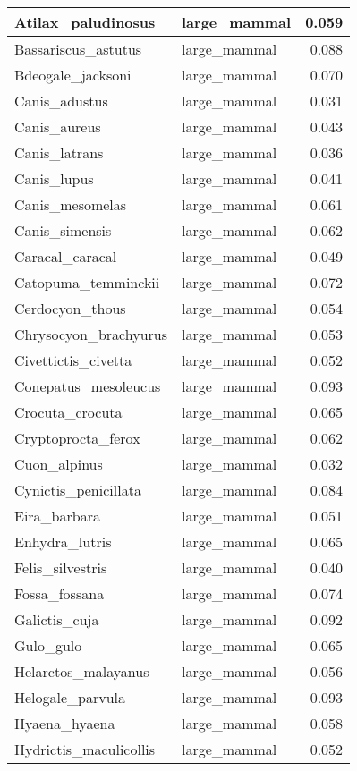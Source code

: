 \begin{table}
\begin{tabular}[t]{l|l|r}
\hline
Atilax\_paludinosus & large\_mammal & 0.059\\
\hline
Bassariscus\_astutus & large\_mammal & 0.088\\
\hline
Bdeogale\_jacksoni & large\_mammal & 0.070\\
\hline
Canis\_adustus & large\_mammal & 0.031\\
\hline
Canis\_aureus & large\_mammal & 0.043\\
\hline
Canis\_latrans & large\_mammal & 0.036\\
\hline
Canis\_lupus & large\_mammal & 0.041\\
\hline
Canis\_mesomelas & large\_mammal & 0.061\\
\hline
Canis\_simensis & large\_mammal & 0.062\\
\hline
Caracal\_caracal & large\_mammal & 0.049\\
\hline
Catopuma\_temminckii & large\_mammal & 0.072\\
\hline
Cerdocyon\_thous & large\_mammal & 0.054\\
\hline
Chrysocyon\_brachyurus & large\_mammal & 0.053\\
\hline
Civettictis\_civetta & large\_mammal & 0.052\\
\hline
Conepatus\_mesoleucus & large\_mammal & 0.093\\
\hline
Crocuta\_crocuta & large\_mammal & 0.065\\
\hline
Cryptoprocta\_ferox & large\_mammal & 0.062\\
\hline
Cuon\_alpinus & large\_mammal & 0.032\\
\hline
Cynictis\_penicillata & large\_mammal & 0.084\\
\hline
Eira\_barbara & large\_mammal & 0.051\\
\hline
Enhydra\_lutris & large\_mammal & 0.065\\
\hline
Felis\_silvestris & large\_mammal & 0.040\\
\hline
Fossa\_fossana & large\_mammal & 0.074\\
\hline
Galictis\_cuja & large\_mammal & 0.092\\
\hline
Gulo\_gulo & large\_mammal & 0.065\\
\hline
Helarctos\_malayanus & large\_mammal & 0.056\\
\hline
Helogale\_parvula & large\_mammal & 0.093\\
\hline
Hyaena\_hyaena & large\_mammal & 0.058\\
\hline
Hydrictis\_maculicollis & large\_mammal & 0.052\\

\end{tabular}
\end{table}
